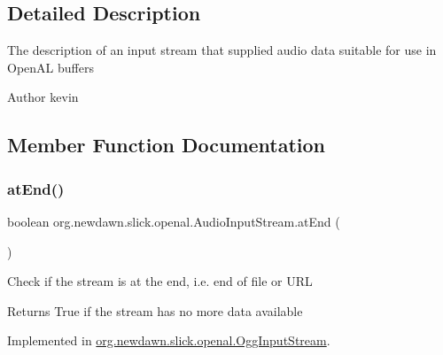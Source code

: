 \subsection{Detailed Description}
The description of an input stream that supplied audio data suitable for use in Open\+AL buffers

\begin{DoxyAuthor}{Author}
kevin 
\end{DoxyAuthor}


\subsection{Member Function Documentation}
\mbox{\label{interfaceorg_1_1newdawn_1_1slick_1_1openal_1_1_audio_input_stream_af2234c4714c7ee9c4cecde2969f2f4b7}} 
\subsubsection{\texorpdfstring{at\+End()}{atEnd()}}
{\footnotesize\ttfamily boolean org.\+newdawn.\+slick.\+openal.\+Audio\+Input\+Stream.\+at\+End (\begin{DoxyParamCaption}{ }\end{DoxyParamCaption})}

Check if the stream is at the end, i.\+e. end of file or U\+RL

\begin{DoxyReturn}{Returns}
True if the stream has no more data available 
\end{DoxyReturn}


Implemented in \mbox{\hyperlink{classorg_1_1newdawn_1_1slick_1_1openal_1_1_ogg_input_stream_a66f42d8e0d5b2c31d638b065f2f3ea46}{org.\+newdawn.\+slick.\+openal.\+Ogg\+Input\+Stream}}.

\mbox{\label{interfaceorg_1_1newdawn_1_1slick_1_1openal_1_1_audio_input_stream_a2b70decb677f0cc88365a689f4953eeb}} 
